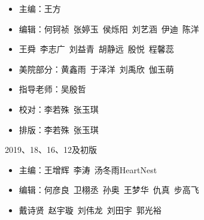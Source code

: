 \begin{titlepage}
\begin{itemize}
\item[] 主\qquad 编：王\quad 方
\item[] 编\qquad 辑：何钶祯\, 张婷玉\, 侯烁阳\, 刘艺涵\, 伊\quad 迪\, 陈\quad 洋
\item[] \hspace*{2.1cm}王\quad 舜\, 李志广\, 刘益青\, 胡静远\, 殷\quad 悦\, 程馨蕊
\item[] 美院部分：黄鑫雨\, 于泽洋\, 刘禹欣\, 伽玉萌
\item[] 指导老师：吴殷哲
\item[] 校\qquad 对：李若殊\, 张玉琪
\item[] 排\qquad 版：李若殊\, 张玉琪
\end{itemize}
\vspace{2cm}\centerline{2019、18、16、12及初版} 
\begin{itemize}

\item[] 主\qquad 编：王增辉\, 李\quad 涛\, 汤冬雨\hspace{0.3cm}HeartNest
\item[] 编\qquad 辑：何彦良\, 卫栩丞\, 孙\quad 奥\, 王梦华\, 仇\quad 真\, 步高飞
\item[] \hspace*{2.1cm}戴诗贤\, 赵宇璇\, 刘伟龙\, 刘田宇\, 郭光裕


\end{itemize}



\clearpage{\pagestyle{empty}\cleardoublepage}%
\end{titlepage}


\clearpage{\pagestyle{empty}\cleardoublepage}

{
\hypersetup{linkcolor=black}
\tableofcontents                        %

}
\clearpage{\pagestyle{empty}\cleardoublepage}
